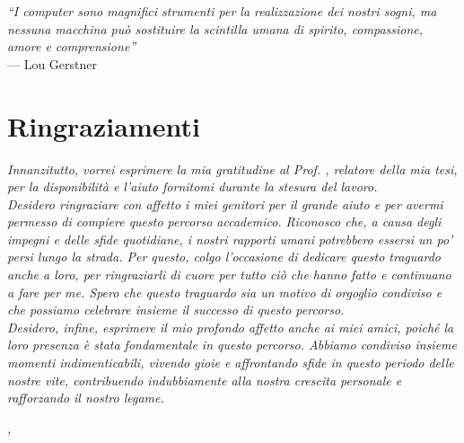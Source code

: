 \cleardoublepage
{}
{}


\begin{flushright}{
    \slshape
    ``I computer sono magnifici strumenti per la realizzazione dei nostri sogni, ma nessuna macchina può sostituire la scintilla umana di spirito, compassione, amore e comprensione''} \\
    \medskip
    --- Lou Gerstner
\end{flushright}


\bigskip

\begingroup
\let\clearpage\relax
\let\cleardoublepage\relax
\let\cleardoublepage\relax

\chapter*{Ringraziamenti}

\noindent \textit{Innanzitutto, vorrei esprimere la mia gratitudine al Prof. \myProf, relatore della mia tesi, per la disponibilità e l'aiuto fornitomi durante la stesura del lavoro.}\\

\noindent \textit{Desidero ringraziare con affetto i miei genitori per il grande aiuto e per avermi permesso di compiere questo percorso accademico.  
Riconosco che, a causa degli impegni e delle sfide quotidiane, i nostri rapporti umani potrebbero essersi un po' persi lungo la strada. 
Per questo, colgo l'occasione di dedicare questo traguardo anche a loro, per ringraziarli di cuore per tutto ciò che hanno fatto e continuano a fare per me. Spero che questo traguardo sia un motivo di orgoglio condiviso e che possiamo celebrare insieme il successo di questo percorso.}\\

\noindent \textit{Desidero, infine, esprimere il mio profondo affetto anche ai miei amici, poiché la loro presenza è stata fondamentale in questo percorso. Abbiamo condiviso insieme momenti indimenticabili, vivendo gioie e affrontando sfide in questo periodo delle nostre vite, contribuendo indubbiamente alla nostra crescita personale e rafforzando il nostro legame.}\\
\bigskip

\noindent\textit{\myLocation, \myTime}
\hfill \myName

\endgroup
